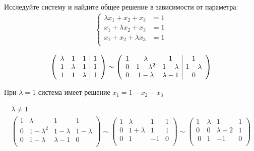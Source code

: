 \begin{prb}[Кострикин 8.2 е]
Исследуйте систему и найдите общее решение в зависимости от параметра:\\

\begin{gather*}
\begin{cases}
\lambda x_1 +  x_2 + x_3 &= 1 \\
 x_1 +  \lambda x_2 + x_3 &= 1 \\
 x_1 +  x_2 + \lambda x_3 &= 1 \\
\end{cases}
\end{gather*}

\end{prb}

\begin{sol}
\begin{gather*}
    \left(\begin{array}{c c c|c}
        \lambda & 1 & 1 & 1\\
        1 & \lambda & 1 & 1\\
        1 & 1 & \lambda & 1\\
    \end{array}\right)
    \sim
    \left(
    \begin{array}{ccc|c}
     1 & \lambda & 1 & 1 \\
     0 & 1  - \lambda^2 & 1 - \lambda & 1 - \lambda \\
     0 & 1 - \lambda & \lambda - 1 & 0 \\
    \end{array}
    \right)
\end{gather*}

При $\lambda = 1$ система имеет решение $x_1 = 1 - x_2 -x_3$

\begin{gather*}
    \lambda \neq 1 \\
    \left(
    \begin{array}{ccc|c}
     1 & \lambda & 1 & 1 \\
     0 & 1  - \lambda^2 & 1 - \lambda & 1 - \lambda \\
     0 & 1 - \lambda & \lambda - 1 & 0 \\
    \end{array}
    \right) \sim 
    \left(
    \begin{array}{ccc|c}
     1 & \lambda & 1 & 1 \\
     0 & 1  + \lambda & 1 & 1 \\
     0 & 1 & -1 & 0 \\
    \end{array}
    \right) \sim
     \left(
    \begin{array}{ccc|c}
     1 & \lambda & 1 & 1 \\
     0 & 0 & \lambda + 2 & 1\\\
     0 & 1 & -1 & 0 \\
    \end{array}
    \right)
\end{gather*}


\end{sol}
